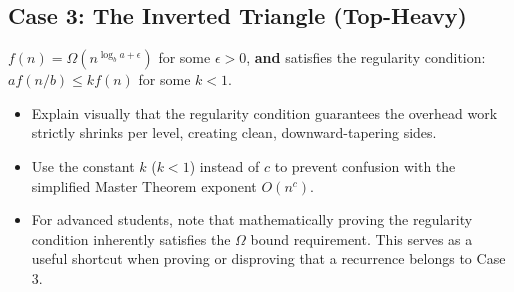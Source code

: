 \vspace{0.5cm}
\begin{center}
\end{center}
\vspace{0.5cm}

\subsection{Case 3: The Inverted Triangle (Top-Heavy)}

\begin{tcolorbox}[colback=accent2!10, colframe=accent2, title=\textbf{Condition}]
$f(n) = \Omega(n^{\log_b a + \epsilon})$ for some $\epsilon > 0$, \textbf{and} satisfies the regularity condition: $a f(n/b) \le k f(n)$ for some $k < 1$.
\end{tcolorbox}

\begin{educatortip}
\begin{itemize}
    \item Explain visually that the regularity condition guarantees the overhead work strictly shrinks per level, creating clean, downward-tapering sides. 

    \item Use the constant $k$ ($k < 1$) instead of $c$ to prevent confusion with the simplified Master Theorem exponent $O(n^c)$. 

    \item  For advanced students, note that mathematically proving the regularity condition inherently satisfies the $\Omega$ bound requirement. This serves as a useful shortcut when proving or disproving that a recurrence belongs to Case 3.
\end{itemize}
\end{educatortip}



